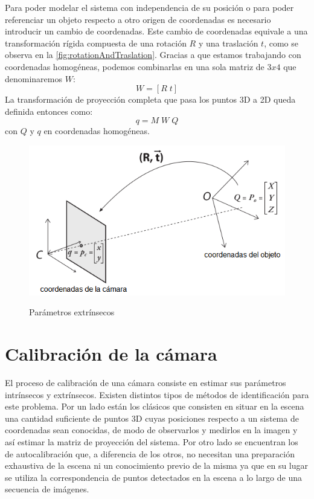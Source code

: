 Para poder modelar el sistema con independencia de su posición o para poder referenciar un objeto respecto a otro origen de coordenadas es necesario introducir un cambio de coordenadas. Este cambio de coordenadas equivale a una transformación rígida compuesta de una rotación $R$ y una traslación $t$, como se observa en la \autoref{fig:rotationAndTraslation}. Gracias a que estamos trabajando con coordenadas homogéneas, podemos combinarlas en una sola matriz de $3x4$ que denominaremos $W$:
\begin{equation}\label{eq:wMatrixRotationAndTraslation}
	W = [R \; t]
\end{equation}
La transformación de proyección completa que pasa los puntos 3D a 2D queda definida entonces como:
\begin{equation*}
	q = M \; W \; Q
\end{equation*}
con $Q$ y $q$ en coordenadas homogéneas.
\begin{figure}[bth]
    \myfloatalign
        {\includegraphics[width=1.0\linewidth]{images/rotationAndTraslation}}
        \caption{Parámetros extrínsecos}
        \label{fig:rotationAndTraslation}
\end{figure}

\section{Calibración de la cámara}
El proceso de calibración de una cámara consiste en estimar sus parámetros intrínsecos y extrínsecos. Existen distintos tipos de métodos de identificación para este problema. Por un lado están los clásicos que consisten en situar en la escena una cantidad suficiente de puntos 3D cuyas posiciones respecto a un sistema de coordenadas sean conocidas, de modo de observarlos y medirlos en la imagen y así estimar la matriz de proyección del sistema. Por otro lado se encuentran los de autocalibración que, a diferencia de los otros, no necesitan una preparación exhaustiva de la escena ni un conocimiento previo de la misma ya que en su lugar se utiliza la correspondencia de puntos detectados en la escena a lo largo de una secuencia de imágenes. 

